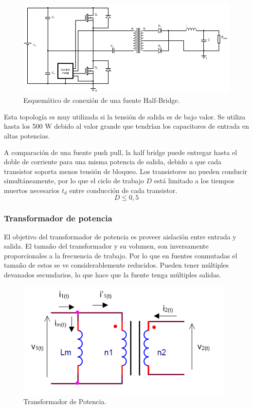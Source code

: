 \documentclass[11pt, a4paper]{article}
\begin{document}
\begin{figure}[h]
	\centering
	\includegraphics[width = 12 cm]{Imagenes/halfbridge}
	\caption{Esquemático de conexión de una fuente Half-Bridge.}
	\label{halfbridge}
\end{figure}

Esta topología es muy utilizada si la tensión de salida es de bajo valor. Se utiliza hasta los 500 W debido al valor grande que tendrían los capacitores de entrada en altas potencias.

A comparación de una fuente push pull, la half bridge puede entregar hasta el doble de corriente para una misma potencia de salida, debido a que cada transistor soporta menos tensión de bloqueo. Los transistores no pueden conducir simultáneamente, por lo que el ciclo de trabajo $D$ está limitado a los tiempos muertos necesarios $t_d$ entre conducción de cada transistor.
\[ D \leq 0,5 \]

\subsubsection{Transformador de potencia}
El objetivo del transformador de potencia es proveer aislación entre entrada y salida. El tamaño del transformador y su volumen, son inversamente proporcionales a la frecuencia de trabajo. Por lo que en fuentes conmutadas el tamaño de estos se ve considerablemente reducidos. Pueden tener múltiples devanados secundarios, lo que hace que la fuente tenga múltiples salidas.

\begin{figure}[h]
	\centering
	\includegraphics[width = 10 cm]{Imagenes/trafo}
	\caption{Transformador de Potencia.}
	\label{trafo}
\end{figure}
\end{document}
